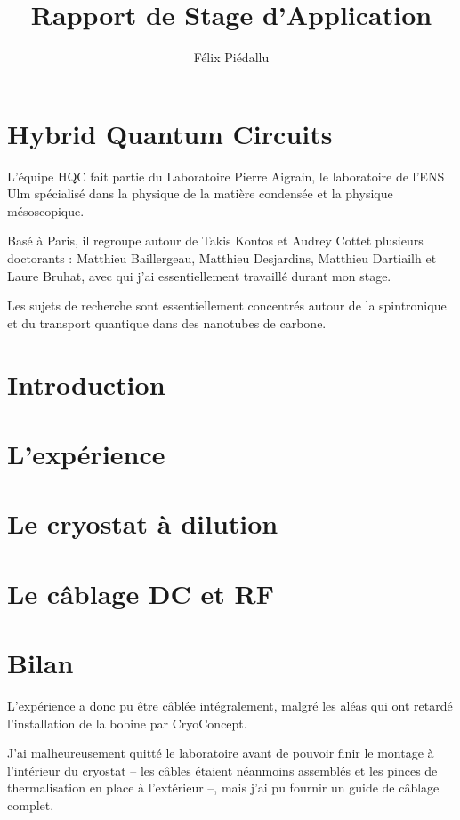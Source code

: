 \documentclass[a4paper,12pt]{report}
\date{}
\title{Rapport de Stage d'Application}
\author{Félix Piédallu}
\begin{document}
\nocite{*}




\chapter*{Hybrid Quantum Circuits}
L'équipe HQC fait partie du Laboratoire Pierre Aigrain, le laboratoire de l'ENS Ulm spécialisé dans la physique de la matière condensée et la physique mésoscopique.

Basé à Paris, il regroupe autour de Takis Kontos et Audrey Cottet plusieurs doctorants : Matthieu Baillergeau, Matthieu Desjardins, Matthieu Dartiailh et Laure Bruhat, avec qui j'ai essentiellement travaillé durant mon stage.

Les sujets de recherche sont essentiellement concentrés autour de la spintronique et du transport quantique dans des nanotubes de carbone.

\chapter*{Introduction} %


\chapter{L'expérience}


\chapter{Le cryostat à dilution}


\chapter{Le câblage DC et RF}


\chapter*{Bilan}

L'expérience a donc pu être câblée intégralement, malgré les aléas qui ont retardé l'installation de la bobine par CryoConcept.

J'ai malheureusement quitté le laboratoire avant de pouvoir finir le montage à l'intérieur du cryostat -- les câbles étaient néanmoins assemblés et les pinces de thermalisation en place à l'extérieur --, mais j'ai pu fournir un guide de câblage complet.\newline
\end{document}
